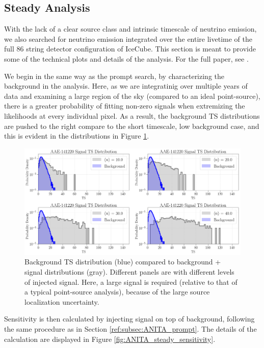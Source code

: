 \subsection{Steady Analysis}
\label{ref:subsec:ANITA_steady}
With the lack of a clear source class and intrinsic timescale of neutrino emission, we also searched for neutrino emission integrated over the entire livetime of the full 86 string detector configuration of IceCube. This section is meant to provide some of the technical plots and details of the analysis. For the full paper, see \cite{Aartsen:2020vir}.

We begin in the same way as the prompt search, by characterizing the background in the analysis. Here, as we are integratinig over multiple years of data and examining a large region of the sky (compared to an ideal point-source), there is a greater probability of fitting non-zero signals when extremizing the likelihoods at every individual pixel. As a result, the background TS distributions are pushed to the right compare to the short timescale, low background case, and this is evident in the distributions in Figure \ref{fig:ANITA_steady_distributions}.

\begin{figure}
    \centering
    \includegraphics[width=.95\linewidth]{figures/ANITA/Steady/AAE-141220_TS_distributions_with_signal.png}
    \caption[ANITA Steady TS distributions]{Background TS distribution (blue) compared to background + signal distributions (gray). Different panels are with different levels of injected signal. Here, a large signal is required (relative to that of a typical point-source analysis), because of the large source localization uncertainty.}
    \label{fig:ANITA_steady_distributions}
\end{figure}

Sensitivity is then calculated by injecting signal on top of background, following the same procedure as in Section \ref{ref:subsec:ANITA_prompt}. The details of the calculation are displayed in Figure \ref{fig:ANITA_steady_sensitivity}.

